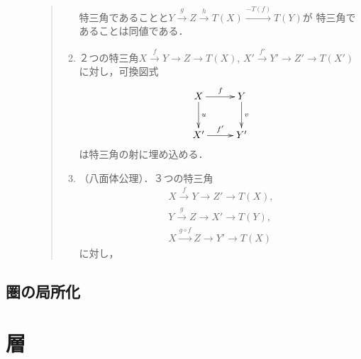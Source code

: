 \begin{Definition}
\begin{description}
\begin{quote}
\begin{enumerate}
                    特三角であることと$Y\overset{g}{\longrightarrow}
                    Z\overset{h}{\longrightarrow} T(X)\overset{-T(f)}{\longrightarrow} T(Y)$が
                    特三角であることは同値である．\label{TR3}
                \item ２つの特三角$X\overset{f}{\to}
                Y\to Z\to T(X)$, $X'\overset{f'}{\to}
                Y'\to Z'\to T(X')$に対し，可換図式
                \begin{equation*}
                    \vcenter{\xymatrix
                    @C=26pt@R=26pt
                    {
                    X\ar[r]^-{f}\ar[d]^-{u}
                    &
                    Y\ar[d]^-{v} 
                    \\
                    X'\ar[r]^-{f'}
                    &
                    Y'
                    }}
                \end{equation*}
                は特三角の射に埋め込める．\label{TR4}
                \item（八面体公理）．３つの特三角
                \begin{align*}
                    X\overset{f}{\to}Y\to Z'\to T(X), \\
                    Y\overset{g}{\to}Z\to X'\to T(Y),\\
                    X\overset{g\circ f}{\longrightarrow}
                    Z\to Y'\to T(X)
                \end{align*}
                に対し， \label{TR5}
            \end{enumerate}    
        \end{quote}
    \end{description}
\end{Definition}

\section{圏の局所化}



\clearpage
\chapter{層}



